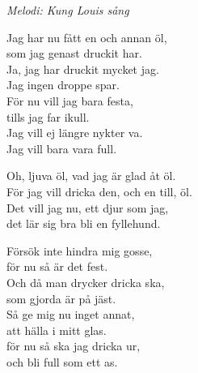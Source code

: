 {\footnotesize\textit{Melodi: Kung Louis sång}}\par
\vspace{10pt}
Jag har nu fått en och annan öl,\\
som jag genast druckit har.\\
Ja, jag har druckit mycket jag.\\
Jag ingen droppe spar.\\
För nu vill jag bara festa,\\
tills jag far ikull.\\
Jag vill ej längre nykter va.\\
Jag vill bara vara full.\par
\vspace{10pt}
Oh, ljuva öl, vad jag är glad åt öl.\\
För jag vill dricka den, och en till, öl.\\
Det vill jag nu, ett djur som jag,\\
det lär sig bra bli en fyllehund.\par
\vspace{10pt}
Försök inte hindra mig gosse,\\
för nu så är det fest.\\
Och då man drycker dricka ska,\\
som gjorda är på jäst.\\
Så ge mig nu inget annat,\\
att hälla i mitt glas.\\
för nu så ska jag dricka ur,\\
och bli full som ett as.
